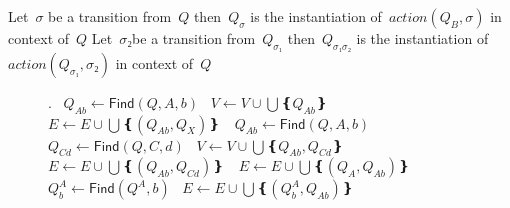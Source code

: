     Let~$σ$ be a transition from~$Q$ then~$Q_{σ}$
    is the instantiation of~$action(Q_{B},σ)$ in context
    of~$Q$
    Let~$σ₂$be a transition from~$Q_{σ₁}$ then~$Q_{σ₁σ₂}$
    is the instantiation of~$action(Q_{σ₁},σ₂)$
    in context of~$Q$
\begin{figure}
  \begin{algorithmic}[1]
    .
     
    \ENDFOR
    \STATE~$Q_{Ab}←\textsf{Find}(Q,A,b)$
    \STATE~$V←V∪\bigcup❴ Q_{Ab}❵~$
    \STATE~$E←E∪\bigcup❴ (Q_{Ab},Q_{X})❵~$
    \ENDFOR
    \STATE~$Q_{Ab}←\textsf{Find}(Q,A,b)$
    \STATE~$Q_{Cd}←\textsf{Find}(Q,C,d)$
    \STATE~$V←V∪\bigcup❴ Q_{Ab},Q_{Cd}❵~$
    \STATE~$E←E∪\bigcup❴ (Q_{Ab},Q_{Cd})❵~$
    \ENDIF
    \ENDFOR
    \STATE~$E←E∪\bigcup❴ (Q_{A},Q_{Ab})❵~$
    \STATE~$Q_{b}^{A}←\textsf{Find}(Q^{A},b)$
    \STATE~$E←E∪\bigcup❴ (Q_{b}^{A},Q_{Ab})❵~$
    \ENDFOR
    \ENDFOR
  \end{algorithmic}
\end{figure}

\endinput
\COMMENT{Returns the state that will consume b, or null, if it cannot be determined.}

